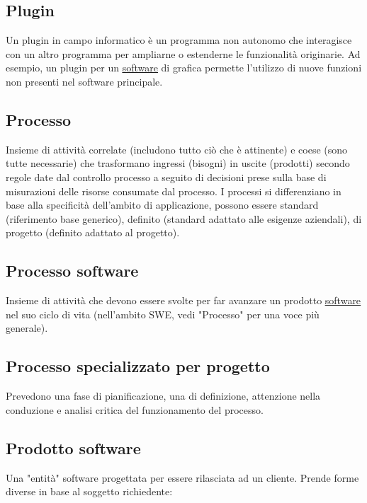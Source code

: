 	\subsection{Plugin}
	\label{sec:plugin}
	Un plugin in campo informatico è un programma non autonomo che interagisce con un altro programma per ampliarne o estenderne le funzionalità originarie. Ad esempio, un plugin per un \underline{\hyperref[sec:prodottosoftware]{software}} di grafica permette l'utilizzo di nuove funzioni non presenti nel software principale.
		
	\subsection{Processo}	
	\label{sec:processi}
	Insieme di attività correlate (includono tutto ciò che è attinente) e coese (sono tutte necessarie) che trasformano ingressi (bisogni) in uscite (prodotti) secondo regole date dal controllo processo a seguito di decisioni prese sulla base di misurazioni delle risorse consumate dal processo.
	I processi si differenziano in base alla specificità dell'ambito di applicazione, possono essere standard (riferimento base generico), definito (standard adattato alle esigenze aziendali), di progetto (definito adattato al progetto).
	
	\subsection{Processo software}
	\label{sec:processisoftware}
	Insieme di attività che devono essere svolte per far avanzare un prodotto \underline{\hyperref[sec:prodottosoftware]{software}} nel suo ciclo di vita (nell'ambito SWE, vedi "Processo" per una voce più generale).

	\subsection{Processo specializzato per progetto}
	\label{sec:processispecializzati}
	Prevedono una fase di pianificazione, una di definizione, attenzione nella conduzione e analisi critica del funzionamento del processo.
	
	\subsection{Prodotto software}
	\label{sec:prodottosoftware}
	Una "entità" software progettata per essere rilasciata ad un cliente.
	Prende forme diverse in base al soggetto richiedente:
		
